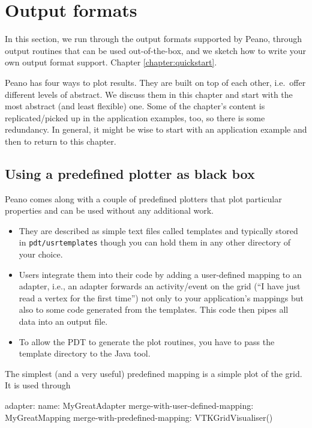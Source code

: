 \section{Output formats}


\chapterDescription
  {
    In this section, we run through the output formats supported by Peano,
    through output routines that can be used out-of-the-box, and we sketch how
    to write your own output format support. 
  } { Chapter
    \ref{chapter:quickstart}.
  }

Peano has four ways to plot results. 
They are built on top of each other, i.e.~offer different levels of abstract.
We discuss them in this chapter and start with the most abstract (and least
flexible) one.
Some of the chapter's content is
    replicated/picked up in the application examples, too, so there is some
    redundancy. In general, it might be wise to start with an application
    example and then to return to this chapter.
    
    
\subsection{Using a predefined plotter as black box}

Peano comes along with a couple of predefined plotters that plot particular
properties and can be used without any additional work. 

\begin{itemize}
  \item They are described as simple text files called templates and typically
  stored in \texttt{pdt/usrtemplates} though you can hold them in any other
  directory of your choice.
  \item Users integrate them into their code by adding a user-defined mapping to
  an adapter, i.e., an adapter forwards an activity/event on the grid (``I have
  just read a vertex for the first time'') not only to your application's
  mappings but also to some code generated from the templates. This code then
  pipes all data into an output file.
  \item To allow the PDT to generate the plot routines, you have to pass the
  template directory to the Java tool.
\end{itemize}

\noindent
The simplest (and a very useful) predefined mapping is a simple plot of the
grid. It is used through
\begin{code}
adapter:
  name: MyGreatAdapter
  merge-with-user-defined-mapping: MyGreatMapping
  merge-with-predefined-mapping: VTKGridVisualiser()
\end{code}

